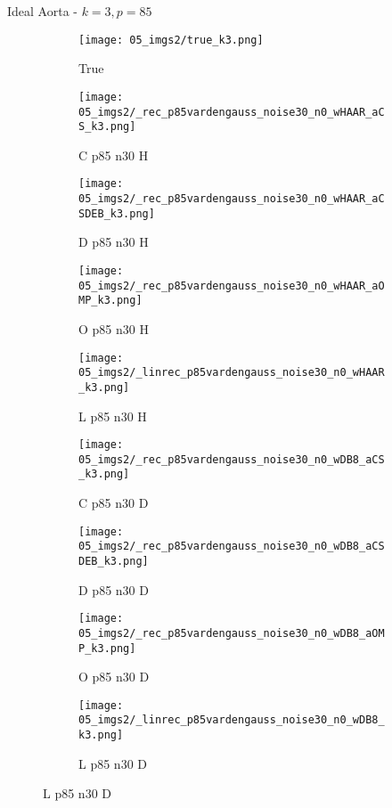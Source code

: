 \begin{frame}{Ideal Aorta - $k=3,p=85$}{}
\begin{figure}
\begin{subfigure}{0.1\textwidth}
\texttt{[image: 05\_imgs2/true\_k3.png]}
\caption*{\Tiny True}
\end{subfigure}
\begin{subfigure}{0.1\textwidth}
\texttt{[image: 05\_imgs2/\_rec\_p85vardengauss\_noise30\_n0\_wHAAR\_aCS\_k3.png]}
\caption*{\Tiny C p85 n30 H}
\end{subfigure}
\begin{subfigure}{0.1\textwidth}
\texttt{[image: 05\_imgs2/\_rec\_p85vardengauss\_noise30\_n0\_wHAAR\_aCSDEB\_k3.png]}
\caption*{\Tiny D p85 n30 H}
\end{subfigure}
\begin{subfigure}{0.1\textwidth}
\texttt{[image: 05\_imgs2/\_rec\_p85vardengauss\_noise30\_n0\_wHAAR\_aOMP\_k3.png]}
\caption*{\Tiny O p85 n30 H}
\end{subfigure}
\begin{subfigure}{0.1\textwidth}
\texttt{[image: 05\_imgs2/\_linrec\_p85vardengauss\_noise30\_n0\_wHAAR\_k3.png]}
\caption*{\Tiny L p85 n30 H}
\end{subfigure}
\begin{subfigure}{0.1\textwidth}
\texttt{[image: 05\_imgs2/\_rec\_p85vardengauss\_noise30\_n0\_wDB8\_aCS\_k3.png]}
\caption*{\Tiny C p85 n30 D}
\end{subfigure}
\begin{subfigure}{0.1\textwidth}
\texttt{[image: 05\_imgs2/\_rec\_p85vardengauss\_noise30\_n0\_wDB8\_aCSDEB\_k3.png]}
\caption*{\Tiny D p85 n30 D}
\end{subfigure}
\begin{subfigure}{0.1\textwidth}
\texttt{[image: 05\_imgs2/\_rec\_p85vardengauss\_noise30\_n0\_wDB8\_aOMP\_k3.png]}
\caption*{\Tiny O p85 n30 D}
\end{subfigure}
\begin{subfigure}{0.1\textwidth}
\texttt{[image: 05\_imgs2/\_linrec\_p85vardengauss\_noise30\_n0\_wDB8\_k3.png]}
\caption*{\Tiny L p85 n30 D}
\end{subfigure}
\end{figure}
\end{frame}

